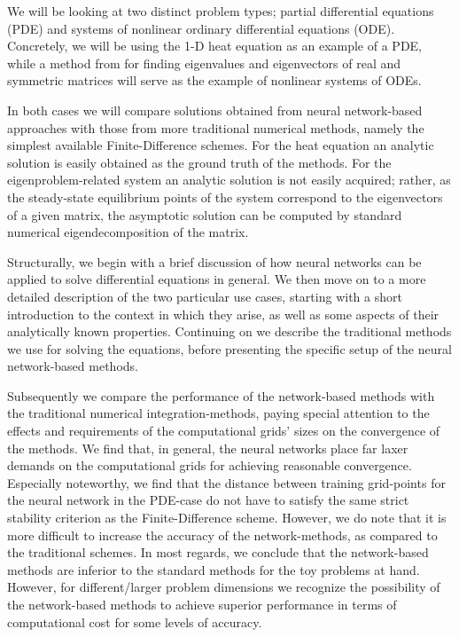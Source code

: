 \documentclass[reprint, english, nofootinbib]{revtex4-2}
\begin{document}
We will be looking at two distinct problem types; partial differential equations (PDE) and systems of nonlinear ordinary differential equations (ODE). Concretely, we will be using the 1-D heat equation as an example of a PDE, while a method from \cite{Yi_2004} for finding eigenvalues and eigenvectors of real and symmetric matrices will serve as the example of nonlinear systems of ODEs.

In both cases we will compare solutions obtained from neural network-based approaches with those from more traditional numerical methods, namely the simplest available Finite-Difference schemes. For the heat equation an analytic solution is easily obtained as the ground truth of the methods. For the eigenproblem-related system an analytic solution is not easily acquired; rather, as the steady-state equilibrium points of the system correspond to the eigenvectors of a given matrix, the asymptotic solution can be computed by standard numerical eigendecomposition of the matrix.

Structurally, we begin with a brief discussion of how neural networks can be applied to solve differential equations in general. We then move on to a more detailed description of the two particular use cases, starting with a short introduction to the context in which they arise, as well as some aspects of their analytically known properties. Continuing on we describe the traditional methods we use for solving the equations, before presenting the specific setup of the neural network-based methods.


Subsequently we compare the performance of the network-based methods with the traditional numerical integration-methods, paying special attention to the effects and requirements of the computational grids' sizes on the convergence of the methods. We find that, in general, the neural networks place far laxer demands on the computational grids for achieving reasonable convergence. Especially noteworthy, we find that the distance between training grid-points for the neural network in the PDE-case do not have to satisfy the same strict stability criterion as the Finite-Difference scheme. However, we do note that it is more difficult to increase the accuracy of the network-methods, as compared to the traditional schemes. In most regards, we conclude that the network-based methods are inferior to the standard methods for the toy problems at hand. However, for different/larger problem dimensions we recognize the possibility of the network-based methods to achieve superior performance in terms of computational cost for some levels of accuracy.
\end{document}
